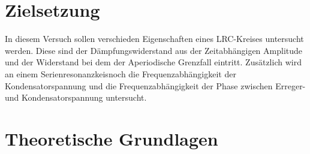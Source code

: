 \section{Zielsetzung}
    In diesem Versuch sollen verschieden Eigenschaften eines LRC-Kreises untersucht werden. Diese sind der Dämpfungswiderstand aus der 
    Zeitabhängigen Amplitude und der Widerstand bei dem der Aperiodische Grenzfall eintritt. Zusätzlich wird an einem 
    Serienresonanzkeisnoch die Frequenzabhängigkeit der Kondensatorspannung und die Frequenzabhängigkeit der Phase zwischen Erreger- und 
    Kondensatorspannung untersucht.

\section{Theoretische Grundlagen}

    \subsection{}